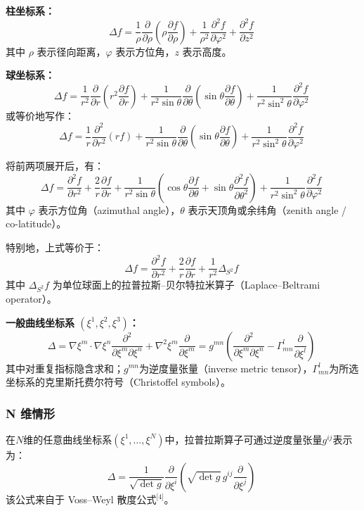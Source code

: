 \textbf{柱坐标系：}
\[
\Delta f
= \frac{1}{\rho}
  \frac{\partial}{\partial \rho}
  \left( \rho \frac{\partial f}{\partial \rho} \right)
+ \frac{1}{\rho^{2}}
  \frac{\partial^{2} f}{\partial \varphi^{2}}
+ \frac{\partial^{2} f}{\partial z^{2}}~
\]
其中 $\rho$ 表示径向距离，$\varphi$ 表示方位角，$z$ 表示高度。

\textbf{球坐标系：}
\[
\Delta f
= \frac{1}{r^{2}}
  \frac{\partial}{\partial r}
  \left( r^{2} \frac{\partial f}{\partial r} \right)
+ \frac{1}{r^{2} \sin \theta}
  \frac{\partial}{\partial \theta}
  \left( \sin \theta \frac{\partial f}{\partial \theta} \right)
+ \frac{1}{r^{2} \sin^{2} \theta}
  \frac{\partial^{2} f}{\partial \varphi^{2}}~
\]
或等价地写作：
\[
\Delta f
= \frac{1}{r} \frac{\partial^{2}}{\partial r^{2}}(r f)
+ \frac{1}{r^{2} \sin \theta}
  \frac{\partial}{\partial \theta}
  \left( \sin \theta \frac{\partial f}{\partial \theta} \right)
+ \frac{1}{r^{2} \sin^{2} \theta}
  \frac{\partial^{2} f}{\partial \varphi^{2}}~
\]

将前两项展开后，有：
\[
\Delta f
= \frac{\partial^{2} f}{\partial r^{2}}
+ \frac{2}{r} \frac{\partial f}{\partial r}
+ \frac{1}{r^{2} \sin \theta}
  \left( \cos \theta \frac{\partial f}{\partial \theta}
       + \sin \theta \frac{\partial^{2} f}{\partial \theta^{2}} \right)
+ \frac{1}{r^{2} \sin^{2} \theta}
  \frac{\partial^{2} f}{\partial \varphi^{2}}~
\]
其中 $\varphi$ 表示方位角（azimuthal angle），$\theta$ 表示天顶角或余纬角（zenith angle / co-latitude）。

特别地，上式等价于：
\[
\Delta f
= \frac{\partial^{2} f}{\partial r^{2}}
+ \frac{2}{r} \frac{\partial f}{\partial r}
+ \frac{1}{r^{2}} \Delta_{S^{2}} f~
\]
其中 $\Delta_{S^{2}} f$ 为单位球面上的拉普拉斯–贝尔特拉米算子（Laplace–Beltrami operator）。

\textbf{一般曲线坐标系 $(\xi^{1}, \xi^{2}, \xi^{3})$：}
\[
\Delta
= \nabla \xi^{m} \cdot \nabla \xi^{n}
  \frac{\partial^{2}}{\partial \xi^{m} \partial \xi^{n}}
+ \nabla^{2} \xi^{m}
  \frac{\partial}{\partial \xi^{m}}
= g^{mn} \left(
  \frac{\partial^{2}}{\partial \xi^{m} \partial \xi^{n}}
  - \Gamma^{l}_{mn}
    \frac{\partial}{\partial \xi^{l}}
\right)~
\]
其中对重复指标隐含求和；$g^{mn}$为逆度量张量（inverse metric tensor），$\Gamma^{l}_{mn}$为所选坐标系的克里斯托费尔符号（Christoffel symbols）。
\subsubsection{N 维情形}
在$N$维的任意曲线坐标系$(\xi^{1}, \ldots, \xi^{N})$中，拉普拉斯算子可通过逆度量张量$g^{ij}$表示为：
\[
\Delta
= \frac{1}{\sqrt{\det g}}
  \frac{\partial}{\partial \xi^{i}}
  \left(
    \sqrt{\det g}\,
    g^{ij}
    \frac{\partial}{\partial \xi^{j}}
  \right)~
\]
该公式来自于 Voss–Weyl 散度公式\(^\text{[4]}\)。

